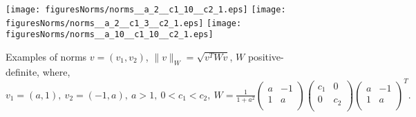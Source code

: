 \begin{figure}[!htbp]
  \centering
    \texttt{[image: figuresNorms/norms\_\_a\_2\_\_c1\_10\_\_c2\_1.eps]}
    \texttt{[image: figuresNorms/norms\_\_a\_2\_\_c1\_3\_\_c2\_1.eps]}
    \texttt{[image: figuresNorms/norms\_\_a\_10\_\_c1\_10\_\_c2\_1.eps]}
  \caption[Examples of norms $v = (v_1,v_2)$, $\|v\|_W = \sqrt{v^TWv}$, $W$ positive-definite]%
{Examples of norms $v = (v_1,v_2)$,  $\|v\|_W = \sqrt{v^TWv}$, $W$ positive-definite,
where,
$
  v_1 = (a,1), \
  v_2 = (-1,a), \
  a > 1, \
  0<c_1 < c_2, \
  W = \frac{1}{1+a^2}
  \begin{pmatrix}
    a & -1 \\
    1 & a  \\
  \end{pmatrix}
  \begin{pmatrix}
    c_1 & 0 \\
    0   & c_2  \\
  \end{pmatrix}
  \begin{pmatrix}
    a & -1 \\
    1 & a  \\
  \end{pmatrix}^T.
$
}
  \label{fig_normsW}
\end{figure}













